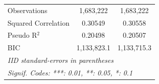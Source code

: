 \begin{tabular}{lcc}
   Observations                                    & 1,683,222      & 1,683,222\\  
   Squared Correlation                             & 0.30549        & 0.30558\\  
   Pseudo R$^2$                                    & 0.20498        & 0.20507\\  
   BIC                                             & 1,133,823.1    & 1,133,715.3\\  
   \midrule \midrule
   \multicolumn{3}{l}{\emph{IID standard-errors in parentheses}}\\
   \multicolumn{3}{l}{\emph{Signif. Codes: ***: 0.01, **: 0.05, *: 0.1}}\\
\end{tabular}
\par\endgroup
